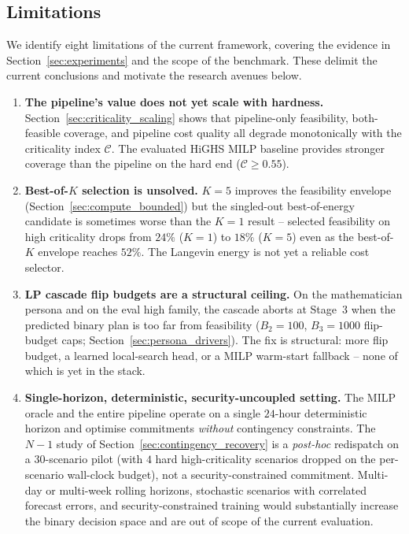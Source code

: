 \documentclass{article}
\begin{document}
\subsection{Limitations}
\label{sec:limitations}

We identify eight limitations of the current framework, covering the evidence in Section~\ref{sec:experiments} and the scope of the benchmark. These delimit the current conclusions and motivate the research avenues below.

\begin{enumerate}[label=\textbf{L\arabic*}, leftmargin=*, itemsep=4pt]
  \item \textbf{The pipeline's value does not yet scale with hardness.} Section~\ref{sec:criticality_scaling} shows that pipeline-only feasibility, both-feasible coverage, and pipeline cost quality all degrade monotonically with the criticality index $\mathcal{C}$. The evaluated HiGHS MILP baseline provides stronger coverage than the pipeline on the hard end ($\mathcal{C} \ge 0.55$).

  \item \textbf{Best-of-$K$ selection is unsolved.} $K=5$ improves the feasibility envelope (Section~\ref{sec:compute_bounded}) but the singled-out best-of-energy candidate is sometimes worse than the $K=1$ result -- selected feasibility on high criticality drops from $24\%$ ($K=1$) to $18\%$ ($K=5$) even as the best-of-$K$ envelope reaches $52\%$. The Langevin energy is not yet a reliable cost selector.

  \item \textbf{LP cascade flip budgets are a structural ceiling.} On the mathematician persona and on the eval high family, the cascade aborts at Stage~3 when the predicted binary plan is too far from feasibility ($B_2 = 100$, $B_3 = 1000$ flip-budget caps; Section~\ref{sec:persona_drivers}). The fix is structural: more flip budget, a learned local-search head, or a MILP warm-start fallback -- none of which is yet in the stack.

  \item \textbf{Single-horizon, deterministic, security-uncoupled setting.} The MILP oracle and the entire pipeline operate on a single $24$-hour deterministic horizon and optimise commitments \emph{without} contingency constraints. The $N{-}1$ study of Section~\ref{sec:contingency_recovery} is a \emph{post-hoc} redispatch on a $30$-scenario pilot (with $4$ hard high-criticality scenarios dropped on the per-scenario wall-clock budget), not a security-constrained commitment. Multi-day or multi-week rolling horizons, stochastic scenarios with correlated forecast errors, and security-constrained training would substantially increase the binary decision space and are out of scope of the current evaluation.


\end{enumerate}
\end{document}
